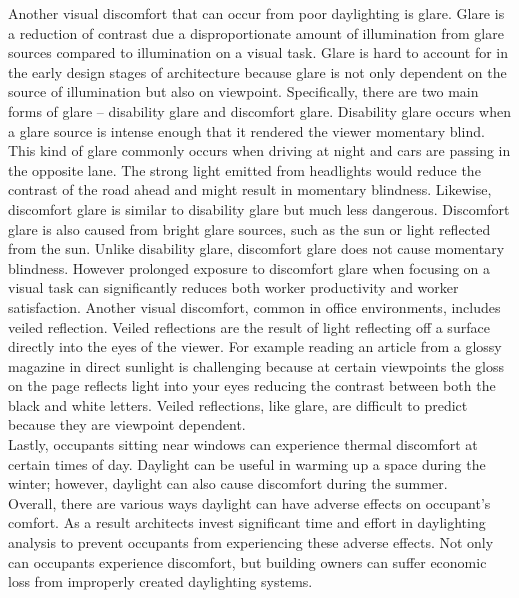     Another visual discomfort that can occur from poor daylighting is glare.
    Glare is a reduction of contrast due a disproportionate amount of illumination from glare sources compared to illumination on a visual task.
    Glare is hard to account for in the early design stages of architecture because glare is not only dependent on the source of illumination but also on viewpoint.
    Specifically, there are two main forms of glare -- disability glare and discomfort glare\cite{Robbins}.
    Disability glare occurs when a glare source is intense enough that it rendered the viewer momentary blind. 
    This kind of glare commonly occurs when driving at night and cars are passing in the opposite lane. 
    The strong light emitted from headlights would reduce the contrast of the road ahead and might result in momentary blindness.
    Likewise, discomfort glare is similar to disability glare but much less dangerous. 
    Discomfort glare is also caused from bright glare sources, such as the sun or light reflected from the sun.
    Unlike disability glare, discomfort glare does not cause momentary blindness.  
    However prolonged exposure to discomfort glare when focusing on a visual task can significantly reduces both worker productivity and worker satisfaction\cite{boyce}. 
    Another visual discomfort, common in office environments, includes veiled reflection.
    Veiled reflections are the result of light reflecting off a surface directly into the eyes of the viewer. 
    For example reading an article from a glossy magazine in direct sunlight is challenging because at certain viewpoints the gloss on the page reflects light into your eyes reducing the contrast between both the black and white letters. 
    Veiled reflections, like glare, are difficult to predict because they are viewpoint dependent. \\

    Lastly, occupants sitting near windows can experience thermal discomfort at certain times of day.
    Daylight can be useful in warming up a space during the winter; however, daylight can also cause discomfort during the summer. \\

    Overall, there are various ways daylight can have adverse effects on occupant's comfort. As a result architects invest significant time and effort in daylighting analysis to prevent occupants from experiencing these adverse effects.
    Not only can occupants experience discomfort, but building owners can suffer economic loss from improperly created daylighting systems.

